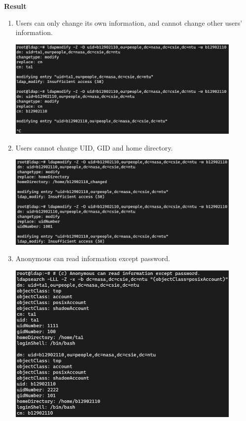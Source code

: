 \documentclass[12pt, a4paper]{article}
\begin{document}
  \textbf{Result}
  \begin{enumerate}[label=(\alph*)]
    \item Users can only change its own information, and cannot change other users'
    information.

    \includegraphics[width=0.9\textwidth]{3-a_ldapmodify.png}

    \item Users cannot change UID, GID and home directory.

    \includegraphics[width=0.9\textwidth]{3-b_ldapmodify.png}

    \item Anonymous can read information except password.

    \includegraphics[width=0.9\textwidth]{3-c_ldapsearch.png}
  \end{enumerate}
\end{document}
